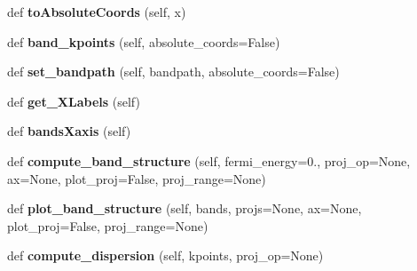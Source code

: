 \begin{DoxyCompactItemize}
\item 
def {\bfseries to\+Absolute\+Coords} (self, x)\hypertarget{classwannier__tools_1_1wannier__system_a8ce7c9888adbe63bda90bc12d8fa2509}{}\label{classwannier__tools_1_1wannier__system_a8ce7c9888adbe63bda90bc12d8fa2509}

\item 
def {\bfseries band\+\_\+kpoints} (self, absolute\+\_\+coords=False)\hypertarget{classwannier__tools_1_1wannier__system_a3c3e556974ac41c6395be85c10765c94}{}\label{classwannier__tools_1_1wannier__system_a3c3e556974ac41c6395be85c10765c94}

\item 
def {\bfseries set\+\_\+bandpath} (self, bandpath, absolute\+\_\+coords=False)\hypertarget{classwannier__tools_1_1wannier__system_a202eba5a09b7fda11184fb59fc8965eb}{}\label{classwannier__tools_1_1wannier__system_a202eba5a09b7fda11184fb59fc8965eb}

\item 
def {\bfseries get\+\_\+\+X\+Labels} (self)\hypertarget{classwannier__tools_1_1wannier__system_af7219ab9427179e77c5cdb506b0ee8d2}{}\label{classwannier__tools_1_1wannier__system_af7219ab9427179e77c5cdb506b0ee8d2}

\item 
def {\bfseries bands\+Xaxis} (self)\hypertarget{classwannier__tools_1_1wannier__system_a8e86c1865dc5a8b18e27b9a8da5c9bb7}{}\label{classwannier__tools_1_1wannier__system_a8e86c1865dc5a8b18e27b9a8da5c9bb7}

\item 
def {\bfseries compute\+\_\+band\+\_\+structure} (self, fermi\+\_\+energy=0., proj\+\_\+op=None, ax=None, plot\+\_\+proj=False, proj\+\_\+range=None)\hypertarget{classwannier__tools_1_1wannier__system_a52cfe2e57e3ecf3b2da0c9b3a7a68bc6}{}\label{classwannier__tools_1_1wannier__system_a52cfe2e57e3ecf3b2da0c9b3a7a68bc6}

\item 
def {\bfseries plot\+\_\+band\+\_\+structure} (self, bands, projs=None, ax=None, plot\+\_\+proj=False, proj\+\_\+range=None)\hypertarget{classwannier__tools_1_1wannier__system_a065a5c97b9369c76a6f86988d9b414b1}{}\label{classwannier__tools_1_1wannier__system_a065a5c97b9369c76a6f86988d9b414b1}

\item 
def {\bfseries compute\+\_\+dispersion} (self, kpoints, proj\+\_\+op=None)\hypertarget{classwannier__tools_1_1wannier__system_a8ce170e12aec3bed3b717805c4500796}{}\label{classwannier__tools_1_1wannier__system_a8ce170e12aec3bed3b717805c4500796}


\end{DoxyCompactItemize}
